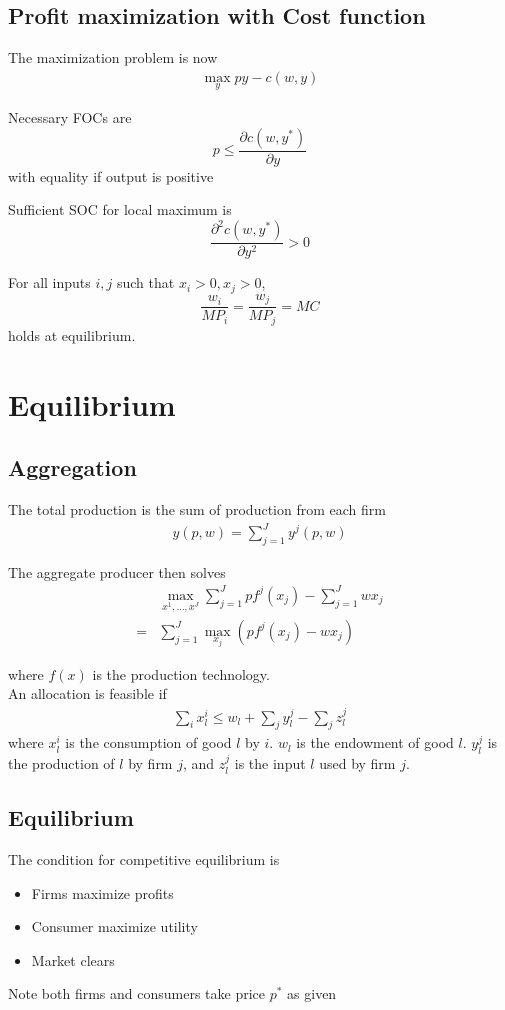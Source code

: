 \documentclass[twocolumn, fleqn]{article}
\begin{document}
		\subsection{Profit maximization with Cost function}
		The maximization problem is now 
		\begin{align*}
			\max_y py-c(w,y)
		\end{align*}
		
		Necessary FOCs are
		\[p \leq \frac{\partial c(w,y^\ast)}{\partial y}\]
		with equality if output is positive
		
		Sufficient SOC for local maximum is 
		\[\frac{\partial^2 c(w,y^\ast)}{\partial y^2}>0\]
		
		For all inputs $i,j$ such that $x_i>0, x_j>0$,
		\[\frac{w_i}{MP_i} = \frac{w_j}{MP_j} = MC\]
		holds at equilibrium.
		
		\section{Equilibrium}
		\subsection{Aggregation}
		The total production is the sum of production from each firm
		\begin{align*}
			y(p,w) = \sum_{j=1}^{J} y^j(p,w)
		\end{align*}
		
		The aggregate producer then solves
		\begin{align*}
			&\max_{x^1, \ldots,x^J} \sum_{j=1}^J p f^j(x_j) - \sum_{j=1}^J w x_j \\
			=&\sum_{j=1}^{J} \max_{x_j} (pf^j(x_j)-wx_j)
		\end{align*}
		
		where $f(x)$ is the production technology.\\
		
		An allocation is feasible if 
		\begin{align*}
			\sum_i x_l^i \leq w_l + \sum_j y_l^j - \sum_j z_l^j
		\end{align*}
		where $x_l^i$ is the consumption of good $l$ by $i$. $w_l$ is the endowment of good $l$. $y_l^j$ is the production of $l$ by firm $j$, and $z_l^j$ is the input $l$ used by firm $j$.
		
		\subsection{Equilibrium}
		The condition for competitive equilibrium is 
		\begin{itemize}
			\item Firms maximize profits
			\item Consumer maximize utility
			\item Market clears
		\end{itemize}
		Note both firms and consumers take price $p^\ast$ as given\\
		
\end{document}
